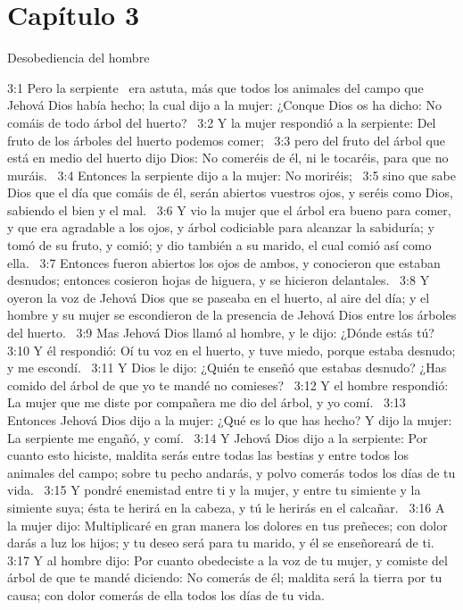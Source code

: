 \section*{Capítulo 3}
Desobediencia del hombre  

3:1 Pero la serpiente  era astuta, más que todos los animales del campo que Jehová Dios había hecho; la cual dijo a la mujer: ¿Conque Dios os ha dicho: No comáis de todo árbol del huerto?  
3:2 Y la mujer respondió a la serpiente: Del fruto de los árboles del huerto podemos comer;  
3:3 pero del fruto del árbol que está en medio del huerto dijo Dios: No comeréis de él, ni le tocaréis, para que no muráis.  
3:4 Entonces la serpiente dijo a la mujer: No moriréis;  
3:5 sino que sabe Dios que el día que comáis de él, serán abiertos vuestros ojos, y seréis como Dios, sabiendo el bien y el mal.  
3:6 Y vio la mujer que el árbol era bueno para comer, y que era agradable a los ojos, y árbol codiciable para alcanzar la sabiduría; y tomó de su fruto, y comió; y dio también a su marido, el cual comió así como ella.  
3:7 Entonces fueron abiertos los ojos de ambos, y conocieron que estaban desnudos; entonces cosieron hojas de higuera, y se hicieron delantales.  
3:8 Y oyeron la voz de Jehová Dios que se paseaba en el huerto, al aire del día; y el hombre y su mujer se escondieron de la presencia de Jehová Dios entre los árboles del huerto.  
3:9 Mas Jehová Dios llamó al hombre, y le dijo: ¿Dónde estás tú?  
3:10 Y él respondió: Oí tu voz en el huerto, y tuve miedo, porque estaba desnudo; y me escondí.  
3:11 Y Dios le dijo: ¿Quién te enseñó que estabas desnudo? ¿Has comido del árbol de que yo te mandé no comieses?  
3:12 Y el hombre respondió: La mujer que me diste por compañera me dio del árbol, y yo comí.  
3:13 Entonces Jehová Dios dijo a la mujer: ¿Qué es lo que has hecho? Y dijo la mujer: La serpiente me engañó, y comí.  
3:14 Y Jehová Dios dijo a la serpiente: Por cuanto esto hiciste, maldita serás entre todas las bestias y entre todos los animales del campo; sobre tu pecho andarás, y polvo comerás todos los días de tu vida.  
3:15 Y pondré enemistad entre ti y la mujer, y entre tu simiente y la simiente suya; ésta te herirá en la cabeza, y tú le herirás en el calcañar.  
3:16 A la mujer dijo: Multiplicaré en gran manera los dolores en tus preñeces; con dolor darás a luz los hijos; y tu deseo será para tu marido, y él se enseñoreará de ti.  
3:17 Y al hombre dijo: Por cuanto obedeciste a la voz de tu mujer, y comiste del árbol de que te mandé diciendo: No comerás de él; maldita será la tierra por tu causa; con dolor comerás de ella todos los días de tu vida.  
